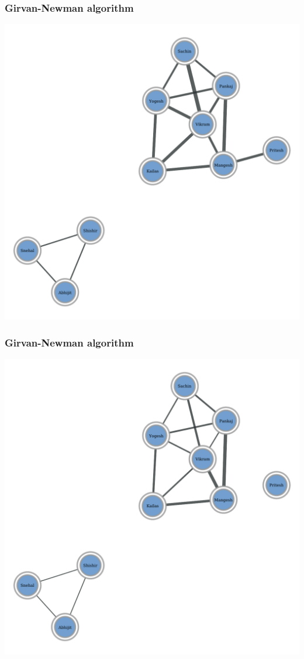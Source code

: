 \documentclass{beamer}
\begin{document}
\begin{frame}
    \frametitle{Girvan-Newman algorithm}
    \centering
    \includegraphics[width=0.8\columnwidth]{gn2.pdf}
\end{frame}
\begin{frame}
    \frametitle{Girvan-Newman algorithm}
    \centering
    \includegraphics[width=0.8\columnwidth]{gn3.pdf}
\end{frame}
\end{document}
